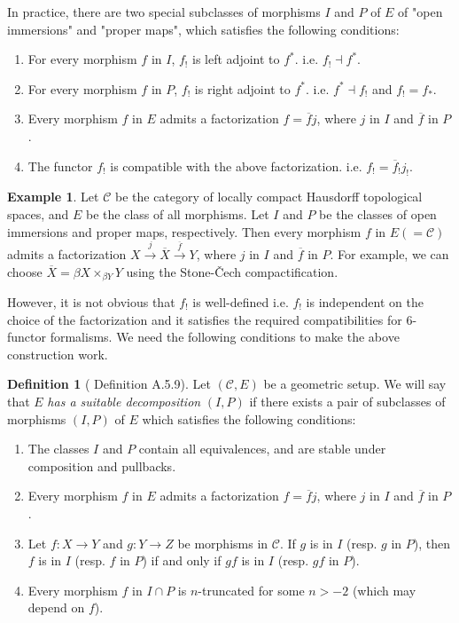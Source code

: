 \documentclass[a4paper,dvipdfmx,11pt,reqno]{amsart}
\newcommand{\C}{\mathcal{C}}
\theoremstyle{definition}
\newtheorem{definition}[theorem]{Definition}
\newtheorem{example}[theorem]{Example}
\begin{document}
In practice, there are two special subclasses of morphisms $I$ and $P$ of $E$ of "open immersions" and "proper maps", which satisfies the following conditions:
\begin{enumerate}
  \item For every morphism $f$ in $I$, $f_{!}$ is left adjoint to $f^{*}$. i.e. $f_! \dashv f^{*}$.
  \item For every morphism $f$ in $P$, $f_{!}$ is right adjoint to $f^{*}$. i.e. $f^{*} \dashv f_!$ and $f_{!} = f_{*}$.
  \item Every morphism $f$ in $E$ admits a factorization $f=\overline{f}j$, where $j$ in $I$ and $\overline{f}$ in $P$. 
  \item The functor $f_{!}$ is compatible with the above factorization. i.e. $f_{!} = \overline{f}_{!}j_{!}$.
\end{enumerate}

\begin{example} \label{Sch.eg.4.1}
  Let $\C$ be the category of locally compact Hausdorff topological spaces, and $E$ be the class of all morphisms.
  Let $I$ and $P$ be the classes of open immersions and proper maps, respectively.
  Then every morphism $f$ in $E (= \C)$ admits a factorization $X \xrightarrow{j} \overline{X} \xrightarrow{\overline{f}} Y$, where $j$ in $I$ and $\overline{f}$ in $P$.
  For example, we can choose $\overline{X} = \beta X \times_{\beta Y} Y$ using the Stone-\v{C}ech compactification. 
\end{example}

However, it is not obvious that $f_{!}$ is well-defined i.e. $f_{!}$ is independent on the choice of the factorization and it satisfies the required compatibilities for 6-functor formalisms.
We need the following conditions to make the above construction work.

\begin{definition}[\cite{Mann22} Definition A.5.9] \label{Mann.def.A.5.9}
  Let $(\C,E)$ be a geometric setup.
  We will say that $E$ \textit{has a suitable decomposition} $(I,P)$ if there exists a pair of subclasses of morphisms $(I,P)$ of $E$ which satisfies the following conditions:
  \begin{enumerate}
    \item The classes $I$ and $P$ contain all equivalences, and are stable under composition and pullbacks.
    \item Every morphism $f$ in $E$ admits a factorization $f=\overline{f}j$, where $j$ in $I$ and $\overline{f}$ in $P$.
    \item Let $f : X \to Y$ and $g : Y \to Z$ be morphisms in $\C$.
    If $g$ is in $I$ (resp. $g$ in $P$), then $f$ is in $I$ (resp. $f$ in $P$) if and only if $gf$ is in $I$ (resp. $gf$ in $P$).
    \item Every morphism $f$ in $I \cap P$ is $n$-truncated for some $n > -2$ (which may depend on $f$).
  \end{enumerate}
\end{definition}
\end{document}
